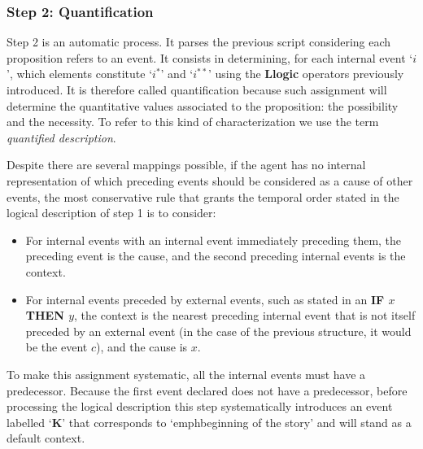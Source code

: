 \documentclass[
		twoside,openright,titlepage,numbers=noenddot,manychapters,
		headinclude,%
                footinclude=false,cleardoublepage=empty,
                BCOR=5mm,
		fontsize=11pt, %
                 enabledeprecatedfontcommands]{scrreprt}
\begin{document}
\subsubsection{Step 2: Quantification}

\label{quant_des}
Step 2 is an automatic process. It parses the previous script considering each proposition refers to an event. It consists in determining, for each internal event ‘$i$’, which elements constitute ‘$i^*$’ and ‘$i^{**}$’ using the \textbf{Llogic} operators previously introduced. It is therefore called quantification because such assignment will determine the quantitative values associated to the proposition: the possibility and the necessity. To refer to this kind of characterization we use the term \emph{quantified description}.  %


Despite there are several mappings possible, if the agent has no internal representation of which preceding events should be considered as a cause of other events, the most conservative rule that grants the temporal order stated in the logical description of step 1 is to consider:
\begin{itemize}
\item	For internal events with an internal event immediately preceding them, the preceding event is the cause, and the second preceding internal events is the context. 
\item	For internal events preceded by external events, such as stated in an \textbf{IF $x$ THEN $y$}, the context is the nearest preceding internal event that is not itself preceded by an external event (in the case of the previous structure, it would be the event $c$), and the cause is $x$.
\end{itemize}

To make this assignment systematic, all the internal events must have a predecessor. Because the first event declared does not have a predecessor, before processing the logical description this step systematically introduces an event labelled ‘\textbf{K}’ that corresponds to ‘emph{beginning of the story}’ and will stand as a default context.

\end{document}
